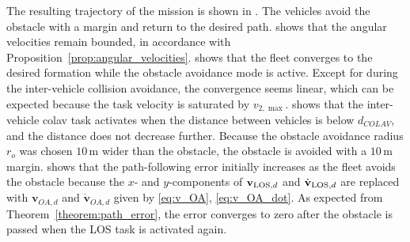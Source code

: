 The resulting trajectory of the mission is shown in . The vehicles avoid the obstacle with a margin and return to the desired path.  shows that the angular velocities remain bounded, in accordance with Proposition~\ref{prop:angular_velocities}.  shows that the fleet converges to the desired formation while the obstacle avoidance mode is active. Except for during the inter-vehicle collision avoidance, the convergence seems linear, which can be expected because the task velocity is saturated by $v_{2,\max}$.  shows that the inter-vehicle \gls{colav} task activates when the distance between vehicles is below $d_{COLAV}$, and the distance does not decrease further. Because the obstacle avoidance radius $r_o$ was chosen $10\, \mathrm{m}$ wider than the obstacle, the obstacle is avoided with a $10\, \mathrm{m}$ margin.  shows that the path-following error initially increases as the fleet avoids the obstacle because the $x$- and $y$-components of $\mathbf{v}_{{\rm LOS}, d}$ and $\dot{\mathbf{v}}_{{\rm LOS}, d}$ are replaced with $\mathbf{v}_{OA,d}$ and $\dot{\mathbf{v}}_{OA,d}$ given by \eqref{eq:v_OA}, \eqref{eq:v_OA_dot}. As expected from Theorem~\ref{theorem:path_error}, the error converges to zero after the obstacle is passed when the LOS task is activated again.
